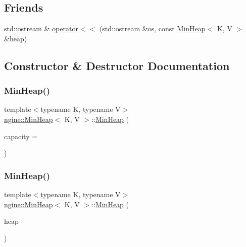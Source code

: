 \subsection*{Friends}
\begin{DoxyCompactItemize}
\item 
std\+::ostream \& \hyperlink{classngine_1_1MinHeap_a42d373586d09ef865418447803f59a8e}{operator$<$$<$} (std\+::ostream \&os, const \hyperlink{classngine_1_1MinHeap}{Min\+Heap}$<$ K, V $>$ \&heap)
\end{DoxyCompactItemize}


\subsection{Constructor \& Destructor Documentation}
\mbox{\label{classngine_1_1MinHeap_a93985caaf1556618510ebcc73471b1de}} 
\subsubsection{\texorpdfstring{Min\+Heap()}{MinHeap()}\hspace{0.1cm}{\footnotesize\ttfamily [1/2]}}
{\footnotesize\ttfamily template$<$typename K, typename V$>$ \\
\hyperlink{classngine_1_1MinHeap}{ngine\+::\+Min\+Heap}$<$ K, V $>$\+::\hyperlink{classngine_1_1MinHeap}{Min\+Heap} (\begin{DoxyParamCaption}\item[{std\+::size\+\_\+t}]{capacity = {} }\end{DoxyParamCaption})\hspace{0.3cm}{\ttfamily [inline]}}

\mbox{\label{classngine_1_1MinHeap_ac11539354d85e877e6493452bd155cb2}} 
\subsubsection{\texorpdfstring{Min\+Heap()}{MinHeap()}\hspace{0.1cm}{\footnotesize\ttfamily [2/2]}}
{\footnotesize\ttfamily template$<$typename K, typename V$>$ \\
\hyperlink{classngine_1_1MinHeap}{ngine\+::\+Min\+Heap}$<$ K, V $>$\+::\hyperlink{classngine_1_1MinHeap}{Min\+Heap} (\begin{DoxyParamCaption}\item[{const \hyperlink{classngine_1_1MinHeap}{Min\+Heap}$<$ K, V $>$ \&}]{heap }\end{DoxyParamCaption})\hspace{0.3cm}{\ttfamily [inline]}}



